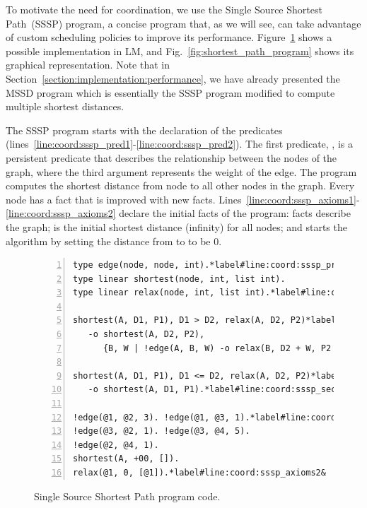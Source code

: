 To motivate the need for coordination, we use the Single Source Shortest
Path~(SSSP) program, a concise program that, as we will see, can take advantage
of custom scheduling policies to improve its performance.
Figure~\ref{code:shortest_path_program} shows a possible implementation in LM,
and Fig.~\ref{fig:shortest_path_program} shows its graphical representation.
Note that in Section~\ref{section:implementation:performance}, we have already
presented the MSSD program which is essentially the SSSP program modified to compute
multiple shortest distances.

The SSSP program starts with the declaration of the predicates~
(lines~\ref{line:coord:sssp_pred1}-\ref{line:coord:sssp_pred2}).  The first
predicate, , is a persistent predicate that describes the
relationship between the nodes of the graph, where the third argument represents
the weight of the edge.  The program computes the shortest distance from node
 to all other nodes in the graph. Every node has a  fact
that is improved with new  facts.
Lines~\ref{line:coord:sssp_axioms1}-\ref{line:coord:sssp_axioms2} declare the
initial facts of the program:  facts describe the graph;
 is the initial shortest distance (infinity) for all
nodes; and  starts the algorithm by setting the
distance from  to  to be 0.

\begin{figure}[ht]
\begin{Verbatim}[numbers=left,fontsize=\codesize,commandchars=\*\#\&]
type edge(node, node, int).*label#line:coord:sssp_pred1&*hfill// Predicate declaration
type linear shortest(node, int, list int).
type linear relax(node, int, list int).*label#line:coord:sssp_pred2&

shortest(A, D1, P1), D1 > D2, relax(A, D2, P2)*label#line:coord:sssp_first1&*hfill// Rule 1: newly improved path
   -o shortest(A, D2, P2),
      {B, W | !edge(A, B, W) -o relax(B, D2 + W, P2 ++ [B])}.*label#line:coord:sssp_first2&

shortest(A, D1, P1), D1 <= D2, relax(A, D2, P2)*label#line:coord:sssp_second1&*hfill// Rule 2: longer path
   -o shortest(A, D1, P1).*label#line:coord:sssp_second2&

!edge(@1, @2, 3). !edge(@1, @3, 1).*label#line:coord:sssp_axioms1&*hfill// Initial facts
!edge(@3, @2, 1). !edge(@3, @4, 5).
!edge(@2, @4, 1).
shortest(A, +00, []).
relax(@1, 0, [@1]).*label#line:coord:sssp_axioms2&
\end{Verbatim}
\caption{Single Source Shortest Path program code.}
\label{code:shortest_path_program}
\end{figure}

